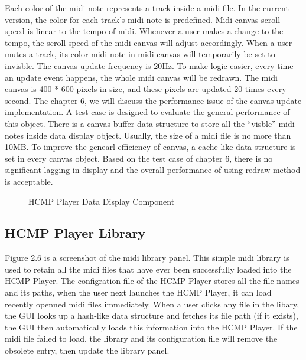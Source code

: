 Each color of the midi note represents a track inside 
a midi file. In the current version, the color for each track's midi note is 
predefined. Midi canvas scroll speed is linear to the tempo of midi. Whenever 
a user makes a change to the tempo, the scroll speed of the midi canvas will adjust
accordingly. When a user mutes a
track, its color midi note in midi canvas will temporarily be set to invisble. 
The canvas
update frequency is 20Hz. To make logic easier, every time an update event 
happens, the whole midi canvas will be redrawn. The midi canvas is 400 * 600 pixels
in size, and these pixels are updated 20 times every second. The chapter 6, we will
discuss the performance issue of the canvas update implementation. A test case is
designed to evaluate the general performance of this object. There is a canvas 
buffer data structure to store all the ``visble'' midi notes inside data 
display object. Usually, the size of a midi file is no more than 10MB. To improve
the genearl efficiency of canvas, a cache like data structure is set in 
every canvas object. Based on the test case of chapter 6, there is no
significant lagging in display and the overall performance of using redraw 
method is acceptable.

\begin{figure}[H]
\caption{HCMP Player Data Display Component}
\label{fig:speciation}
\end{figure}

\subsection{HCMP Player Library}

Figure 2.6 is a screenshot of the midi library panel. This simple midi library is 
used to retain all the midi files that have ever been successfully loaded into 
the HCMP Player. 
The configration file of the HCMP Player stores all the file names and its paths, 
when the user next launches the HCMP Player, it can load
recently openned midi files immediately. When a user clicks any file in the libary, 
the GUI looks up a hash-like data structure and fetches its file path 
(if it exists), the GUI then automatically
loads this information into the HCMP Player. If the midi file failed to load, 
the library and its configuration file will remove the obsolete entry, then 
update the library panel.

